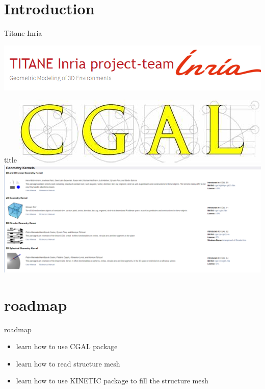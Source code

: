 \documentclass[10pt]{beamer}
\begin{document}
\begin{frame}
    \tableofcontents
\end{frame}
\section{Introduction}
\begin{frame}{Titane Inria}

    \includegraphics[scale=0.5]{Inria-team-logo.png}

    
\end{frame}

\begin{frame}{title}
    \includegraphics[scale = 0.2]{CGAL_logo.png}
    \includegraphics[scale =   0.3 ]{exemple.png}

\end{frame}

\section{roadmap}
\begin{frame}{roadmap}
    \begin{itemize}
        \item learn how to use CGAL package
        \item learn how to read structure mesh
        \item learn how to use KINETIC package to fill the structure mesh  
    \end{itemize}
    
\end{frame}
\end{document}
